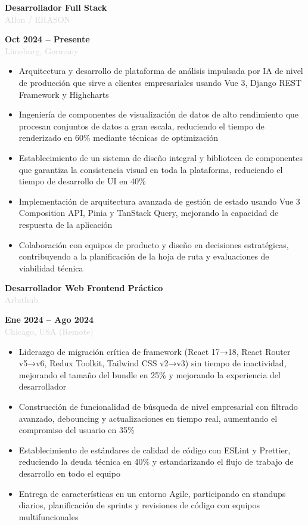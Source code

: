 \documentclass[10pt,a4paper]{article}
\newcommand{\Experience}[4]{%
  \vspace{2pt}
  \noindent
  \begin{minipage}[t]{0.70\textwidth}
    {\normalsize\textbf{\color{darkgray}#3}} \\
    \textcolor{lightgray}{\small #1}
  \end{minipage}%
  \hfill
  \begin{minipage}[t]{0.28\textwidth}
    \raggedleft
    \textcolor{mediumgray}{\small\textbf{#4}} \\
    \textcolor{lightgray}{\small #2}
  \end{minipage}
  \vspace{1pt}
}
\begin{document}
\Experience{AIlon / ERASON}{Lüneburg, Germany}{Desarrollador Full Stack}{Oct 2024 -- Presente}
\begin{itemize}
  \item Arquitectura y desarrollo de plataforma de análisis impulsada por IA de nivel de producción que sirve a clientes empresariales usando Vue 3, Django REST Framework y Highcharts
  \item Ingeniería de componentes de visualización de datos de alto rendimiento que procesan conjuntos de datos a gran escala, reduciendo el tiempo de renderizado en 60\% mediante técnicas de optimización
  \item Establecimiento de un sistema de diseño integral y biblioteca de componentes que garantiza la consistencia visual en toda la plataforma, reduciendo el tiempo de desarrollo de UI en 40\%
  \item Implementación de arquitectura avanzada de gestión de estado usando Vue 3 Composition API, Pinia y TanStack Query, mejorando la capacidad de respuesta de la aplicación
  \item Colaboración con equipos de producto y diseño en decisiones estratégicas, contribuyendo a la planificación de la hoja de ruta y evaluaciones de viabilidad técnica
\end{itemize}

\Experience{Arbithub}{Chicago, USA (Remote)}{Desarrollador Web Frontend Práctico}{Ene 2024 -- Ago 2024}
\begin{itemize}
  \item Liderazgo de migración crítica de framework (React 17→18, React Router v5→v6, Redux Toolkit, Tailwind CSS v2→v3) sin tiempo de inactividad, mejorando el tamaño del bundle en 25\% y mejorando la experiencia del desarrollador
  \item Construcción de funcionalidad de búsqueda de nivel empresarial con filtrado avanzado, debouncing y actualizaciones en tiempo real, aumentando el compromiso del usuario en 35\%
  \item Establecimiento de estándares de calidad de código con ESLint y Prettier, reduciendo la deuda técnica en 40\% y estandarizando el flujo de trabajo de desarrollo en todo el equipo
  \item Entrega de características en un entorno Agile, participando en standups diarios, planificación de sprints y revisiones de código con equipos multifuncionales
\end{itemize}
\end{document}
